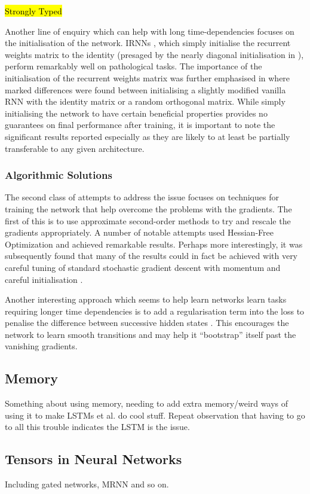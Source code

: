\hl{Strongly Typed}

Another line of enquiry which can help with long time-dependencies focuses on the initialisation
of the network. IRNNs \autocite{Le2015}, which simply initialise the recurrent weights matrix to the
 identity (presaged by the nearly diagonal initialisation in \autocite{Mikolov2015}), perform
remarkably well on pathological tasks. The importance of the initialisation of the recurrent weights
matrix was further emphasised in \autocite{Henaff2016} where marked differences were found between
initialising a slightly modified vanilla RNN with the identity matrix or a random orthogonal matrix.
While simply initialising the network to have certain beneficial properties provides no guarantees
on final performance after training, it is important to note the significant results reported
especially as they are likely to at least be partially transferable to any given architecture.

\subsubsection{Algorithmic Solutions}
The second class of attempts to address the issue focuses on techniques for training the network
that help overcome the problems with the gradients. The first of this is to use approximate
second-order methods to try and rescale the gradients appropriately. A number of notable attempts
used Hessian-Free Optimization \autocite{Martens2011, Boulanger-Lewandowski2012} and achieved
remarkable results. Perhaps more interestingly, it was subsequently found that many of the results
could in fact be achieved with very careful tuning of standard stochastic gradient descent with
momentum and careful initialisation \autocite{Sutskever2013a}.

Another interesting approach which seems to help learn networks learn tasks requiring longer time
dependencies is to add a regularisation term into the loss to penalise the difference between
successive hidden states \autocite{Krueger2016}. This encourages the network to learn smooth
transitions and may help it ``bootstrap'' itself past the vanishing gradients.


\subsection{Memory}
Something about using memory, needing to add extra memory/weird ways of using it to make LSTMs et al.
do cool stuff. Repeat observation that having to go to all this trouble indicates the LSTM is the
issue.

\subsection{Tensors in Neural Networks}
Including gated networks, MRNN and so on.
